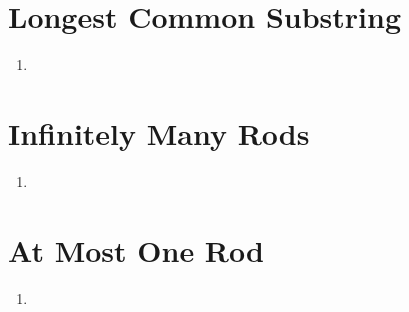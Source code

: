 \documentclass{article}
\begin{document}
\newpage
\section{Longest Common Substring}
\begin{enumerate}
    \item 
\end{enumerate}

\newpage
\section{Infinitely Many Rods}
\begin{enumerate}
    \item 
\end{enumerate}

\newpage
\section{At Most One Rod}
\begin{enumerate}
    \item 
\end{enumerate}
\end{document}
